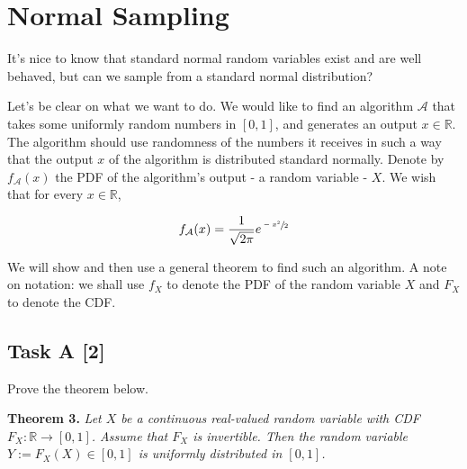 \chapter{Normal Sampling}

\begin{tcolorbox}[title=]
    It’s nice to know that standard normal random variables exist and are well
    behaved, but can we sample from a standard normal distribution?

    Let’s be clear on what we want to do. We would like to find an algorithm
    $\mathcal{A}$ that takes some uniformly random numbers in $[0, 1]$, and
    generates an output $x \in \mathbb{R}$. The algorithm should use randomness
    of the numbers it receives in such a way that the output $x$ of the algorithm
    is distributed standard normally. Denote by $f_\mathcal{A}(x)$ the PDF of the
    algorithm’s output - a random variable - $X$. We wish that for every $x \in
    \mathbb{R}$,

    \begin{equation*}
        f_\mathcal{A}(x) = \dfrac{1}{\sqrt{2\pi}}e^{\sfrac{-x^2}{2}}
    \end{equation*}

    We will show and then use a general theorem to find such an algorithm. A
    note on notation: we shall use $f_X$ to denote the PDF of the random variable
    $X$ and $F_X$ to denote the CDF.
\end{tcolorbox}

\section*{\colS{$\S$} Task A \hfill \normalfont \large [2]}

\begin{tcolorbox}
    Prove the theorem below.

    \vspace{10pt}
    \begin{mdframed}[backgroundcolor=lightyellow, linecolor=darkyellow,
    linewidth=1.5pt]
        \textbf{Theorem 3.}
        \textit{Let $X$ be a continuous real-valued random variable with CDF $F_X:
         \mathbb{R} \xrightarrow{} [0, 1]$. Assume that $F_X$ is invertible. Then
         the random variable $Y := F_X(X) \in [0, 1]$ is uniformly distributed in
         $[0, 1]$.}
    \end{mdframed}
\end{tcolorbox}


